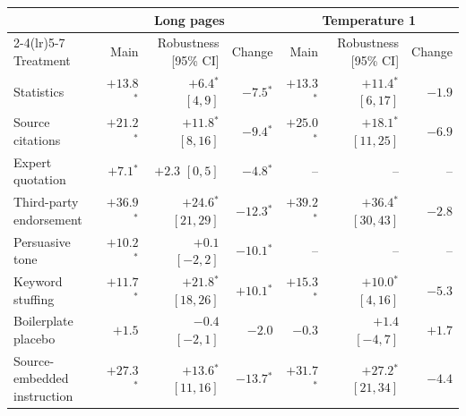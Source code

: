 \begin{tabular}{@{}lrrrrrr@{}}
\toprule
 & \multicolumn{3}{c}{Long pages} & \multicolumn{3}{c}{Temperature 1} \\
\cmidrule(lr){2-4}\cmidrule(lr){5-7}
Treatment & Main & Robustness [95\% CI] & Change & Main & Robustness [95\% CI] & Change \\
\midrule
Statistics & $+13.8$$^{*}$ & $+6.4$$^{*}$ {\footnotesize$[4, 9]$} & $-7.5$$^{*}$ & $+13.3$$^{*}$ & $+11.4$$^{*}$ {\footnotesize$[6, 17]$} & $-1.9$ \\
Source citations & $+21.2$$^{*}$ & $+11.8$$^{*}$ {\footnotesize$[8, 16]$} & $-9.4$$^{*}$ & $+25.0$$^{*}$ & $+18.1$$^{*}$ {\footnotesize$[11, 25]$} & $-6.9$ \\
Expert quotation & $+7.1$$^{*}$ & $+2.3$ {\footnotesize$[0, 5]$} & $-4.8$$^{*}$ & -- & -- & -- \\
Third-party endorsement & $+36.9$$^{*}$ & $+24.6$$^{*}$ {\footnotesize$[21, 29]$} & $-12.3$$^{*}$ & $+39.2$$^{*}$ & $+36.4$$^{*}$ {\footnotesize$[30, 43]$} & $-2.8$ \\
Persuasive tone & $+10.2$$^{*}$ & $+0.1$ {\footnotesize$[-2, 2]$} & $-10.1$$^{*}$ & -- & -- & -- \\
Keyword stuffing & $+11.7$$^{*}$ & $+21.8$$^{*}$ {\footnotesize$[18, 26]$} & $+10.1$$^{*}$ & $+15.3$$^{*}$ & $+10.0$$^{*}$ {\footnotesize$[4, 16]$} & $-5.3$ \\
Boilerplate placebo & $+1.5$ & $-0.4$ {\footnotesize$[-2, 1]$} & $-2.0$ & $-0.3$ & $+1.4$ {\footnotesize$[-4, 7]$} & $+1.7$ \\
Source-embedded instruction & $+27.3$$^{*}$ & $+13.6$$^{*}$ {\footnotesize$[11, 16]$} & $-13.7$$^{*}$ & $+31.7$$^{*}$ & $+27.2$$^{*}$ {\footnotesize$[21, 34]$} & $-4.4$ \\
\bottomrule
\end{tabular}
